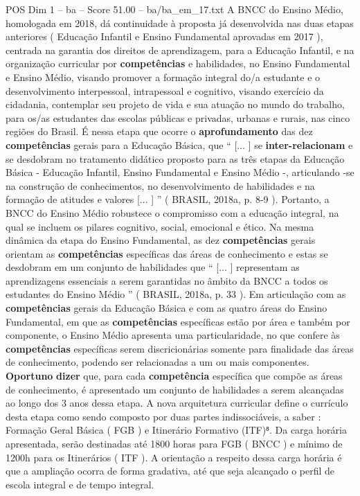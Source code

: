 \begin{textsample}{POS Dim 1 – ba – Score 51.00 – ba/ba\_em\_17.txt}
A BNCC do Ensino Médio, homologada em 2018, dá continuidade à proposta já desenvolvida nas duas etapas anteriores ( Educação Infantil e Ensino Fundamental aprovadas em 2017 ), centrada na garantia dos direitos de aprendizagem, para a Educação Infantil, e na organização curricular por \textbf{competências} e habilidades, no Ensino Fundamental e Ensino Médio, visando promover a formação integral do/a estudante e o desenvolvimento interpessoal, intrapessoal e cognitivo, visando exercício da cidadania, contemplar seu projeto de vida e sua atuação no mundo do trabalho, para os/as estudantes das escolas públicas e privadas, urbanas e rurais, nas cinco regiões do Brasil.
É nessa etapa que ocorre o \textbf{aprofundamento} das dez \textbf{competências} gerais para a Educação Básica, que “ [... ] se \textbf{inter-relacionam} e se desdobram no tratamento didático proposto para as três etapas da Educação Básica - Educação Infantil, Ensino Fundamental e Ensino Médio -, articulando -se na construção de conhecimentos, no desenvolvimento de habilidades e na formação de atitudes e valores [... ] ” ( BRASIL, 2018a, p. 8-9 ).
Portanto, a BNCC do Ensino Médio robustece o compromisso com a educação integral, na qual se incluem os pilares cognitivo, social, emocional e ético.
Na mesma dinâmica da etapa do Ensino Fundamental, as dez \textbf{competências} gerais orientam as \textbf{competências} específicas das áreas de conhecimento e estas se desdobram em um conjunto de habilidades que “ [... ] representam as aprendizagens essenciais a serem garantidas no âmbito da BNCC a todos os estudantes do Ensino Médio ” ( BRASIL, 2018a, p. 33 ).
Em articulação com as \textbf{competências} gerais da Educação Básica e com as quatro áreas do Ensino Fundamental, em que as \textbf{competências} específicas estão por área e também por componente, o Ensino Médio apresenta uma particularidade, no que confere às \textbf{competências} específicas serem discricionárias somente para finalidade das áreas de conhecimento, podendo ser relacionadas a um ou mais componentes. \textbf{Oportuno} \textbf{dizer} que, para cada \textbf{competência} específica que compõe as áreas de conhecimento, é apresentado um conjunto de habilidades a serem alcançadas ao longo dos 3 anos dessa etapa.
A nova arquitetura curricular define o currículo desta etapa como sendo composto por duas partes indissociáveis, a saber : Formação Geral Básica ( FGB ) e Itinerário Formativo (ITF)⁸.
Da carga horária apresentada, serão destinadas até 1800 horas para FGB ( BNCC ) e mínimo de 1200h para os Itinerários ( ITF ).
A orientação a respeito dessa carga horária é que a ampliação ocorra de forma gradativa, até que seja alcançado o perfil de escola integral e de tempo integral.

\end{textsample}
